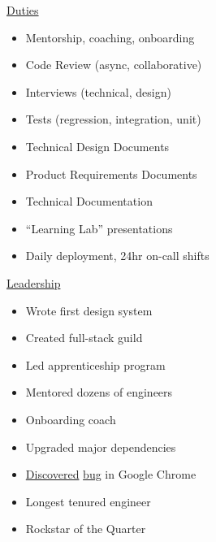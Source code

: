 \documentclass[]{article}
\begin{document}
\hfill
\begin{minipage}[t]{.3\linewidth}
	\uline{Duties}
    \begin{itemize}[label={},leftmargin=0pt]
        \item Mentorship, coaching, onboarding
        \item Code Review (async, collaborative)
        \item Interviews (technical, design)
        \item Tests (regression, integration, unit)
        \item Technical Design Documents
        \item Product Requirements Documents
		\item Technical Documentation
        \item “Learning Lab” presentations
        \item Daily deployment, 24hr on-call shifts
    \end{itemize}
\end{minipage}
\hfill
\begin{minipage}[t]{0.27\linewidth}
    \uline{Leadership}
    \begin{itemize}[label={},leftmargin=0pt]
        \item Wrote first design system
        \item Created full-stack guild
        \item Led apprenticeship program
		\item Mentored dozens of engineers
        \item Onboarding coach
        \item Upgraded major dependencies
		\item \href{https://bugzilla.mozilla.org/show_bug.cgi?id=1708064}{Discovered} \href{https://bugs.chromium.org/p/chromium/issues/detail?id=1204473}{bug} in Google Chrome
        \item Longest tenured engineer
        \item Rockstar of the Quarter
    \end{itemize}
\end{minipage}
\end{document}
